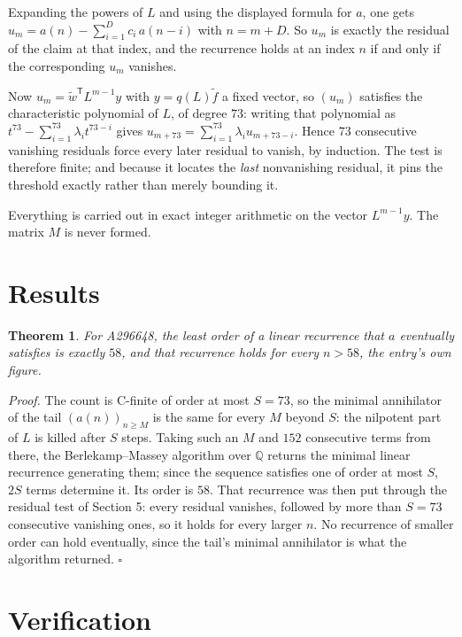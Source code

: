 \documentclass[11pt]{article}
\newtheorem{theorem}{Theorem}
\theoremstyle{definition}
\begin{document}
Expanding the powers of $L$ and using the displayed formula for $a$, one gets $u_m = a(n) - \sum_{i=1}^{D} c_i\,a(n-i)$ with $n = m + D$. So $u_m$ is exactly the residual of the claim at that index, and the recurrence holds at an index $n$ if and only if the corresponding $u_m$ vanishes.

Now $u_m = \tilde w^{\mathsf T} L^{m-1} y$ with $y = q(L)\tilde f$ a fixed vector, so $(u_m)$ satisfies the characteristic polynomial of $L$, of degree $73$: writing that polynomial as $t^{73} - \sum_{i=1}^{73} \lambda_i t^{73-i}$ gives $u_{m+73} = \sum_{i=1}^{73} \lambda_i u_{m+73-i}$. Hence $73$ consecutive vanishing residuals force every later residual to vanish, by induction. The test is therefore finite; and because it locates the {\itshape last} nonvanishing residual, it pins the threshold exactly rather than merely bounding it.

Everything is carried out in exact integer arithmetic on the vector $L^{m-1}y$. The matrix $M$ is never formed.

\section{Results}

\begin{theorem} For A296648, the least order of a linear recurrence that $a$ eventually satisfies is exactly $58$, and that recurrence holds for every $n > 58$, the entry's own figure.\end{theorem}

{\itshape Proof.} The count is C-finite of order at most $S = 73$, so the minimal annihilator of the tail $(a(n))_{n \ge M}$ is the same for every $M$ beyond $S$: the nilpotent part of $L$ is killed after $S$ steps. Taking such an $M$ and $152$ consecutive terms from there, the Berlekamp--Massey algorithm over $\mathbb{Q}$ returns the minimal linear recurrence generating them; since the sequence satisfies one of order at most $S$, $2S$ terms determine it. Its order is $58$. That recurrence was then put through the residual test of Section 5: every residual vanishes, followed by more than $S = 73$ consecutive vanishing ones, so it holds for every larger $n$. No recurrence of smaller order can hold eventually, since the tail's minimal annihilator is what the algorithm returned. $\square$

\section{Verification}
\end{document}
